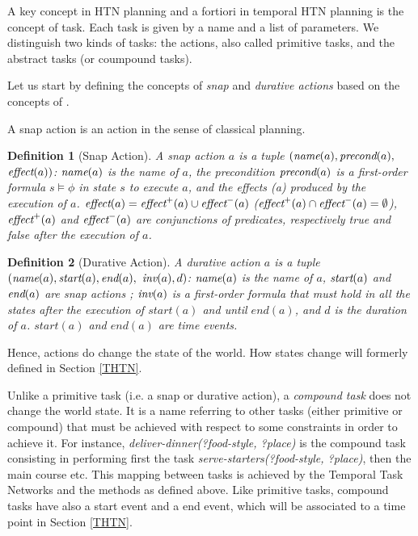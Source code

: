 \documentclass[letterpaper]{article} %
\newtheorem{definition}{Definition}
\newcommand{\name}{\text{\it name}}
\newcommand{\pre}{\text{\it precond}}
\newcommand{\effect}{\text{\it effect}}
\newcommand{\add}{\text{\it effect}^{+}}
\newcommand{\del}{\text{\it effect}^{-}}
\newcommand{\tstart}{\text{\it start}}
\newcommand{\tend}{\text{\it end}}
\newcommand{\tinv}{\text{\it inv}}
\begin{document}
 A key concept in HTN planning and a fortiori in temporal HTN planning is the concept of task. Each task is given by a name and a list of parameters. We distinguish two kinds of tasks: the actions, also called primitive tasks, and the abstract tasks (or coumpound tasks).
 
 
 Let us start by defining the concepts of {\it snap} and {\it durative actions} based on the concepts of \cite{abdulaziz22}.
 
A snap action is an action in the sense of classical planning.
\begin{definition}[Snap Action] A {\em snap action} $a$ is a tuple $(\name(a), \pre(a),$ $\effect(a))$: $\name(a)$ is the name of $a$, the precondition $\pre(a)$ is a first-order formula $s \models \phi$ in state $s$ to execute $a$, and the effects \effect(a) produced by the execution of $a$. $\effect(a) = \add(a) \cup \del(a)$ ($\add(a) \cap \del(a) = \emptyset$), $\add(a)$ and $\del(a)$ are conjunctions of predicates, respectively true and false after the execution of $a$. 
\end{definition}

\begin{definition}[Durative Action]
A {\em durative action} $a$ is a tuple $(\name(a), \tstart(a), \tend(a),$ $\tinv(a), d)$: $\name(a)$ is the name of $a$, $\tstart(a)$ and $\tend(a)$ are snap actions ; $\tinv(a)$ is a first-order formula that must hold in all the states after the execution of $start(a)$ and until $end(a)$, and $d$ is the duration of $a$. $start(a)$ and $end(a)$ are time events.
\end{definition}
Hence, actions do change the state of the world. How states change will formerly defined in Section \ref{THTN}.

Unlike a primitive task (i.e. a snap or durative action), a {\it compound task} does not change the world state. It is a name referring to other tasks (either primitive or compound) that must be achieved with respect to some constraints in order to achieve it. For instance, {\it deliver-dinner(?food-style, ?place)} is the compound task consisting in performing first the task {\it serve-starters(?food-style, ?place)}, then the main course etc. This mapping between tasks is achieved by the Temporal Task Networks and the methods as defined above. Like primitive tasks, compound tasks have also a start event and a end event, which will be associated to a time point in Section \ref{THTN}.
\end{document}

